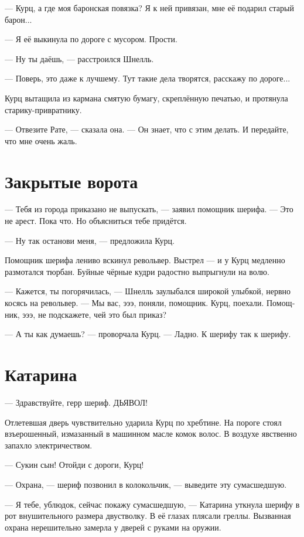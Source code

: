 \documentclass[a4paper,12pt,fleqn]{book}\usepackage{polyglossia}\setdefaultlanguage[babelshorthands=true]{russian}\setotherlanguage{english}\defaultfontfeatures{Ligatures=TeX,Mapping=tex-text}\usepackage{xcolor}\newcommand{\ml}[3]{#2}
\begin{document}
--- Курц, а где моя баронская повязка?
Я к ней привязан, мне её подарил старый барон...

--- Я её выкинула по дороге с мусором.
Прости.

--- Ну ты даёшь, --- расстроился Шнелль.

--- Поверь, это даже к лучшему.
Тут такие дела творятся, расскажу по дороге...

Курц вытащила из кармана смятую бумагу, скреплённую печатью, и протянула старику-привратнику.

--- Отвезите Рате, --- сказала она.
--- Он знает, что с этим делать.
И передайте, что мне очень жаль.

\section{Закрытые ворота}

--- Тебя из города приказано не выпускать, --- заявил помощник шерифа.
--- Это не арест.
Пока что.
Но объясниться тебе придётся.

--- Ну так останови меня, --- предложила Курц.

Помощник шерифа лениво вскинул револьвер.
Выстрел --- и у Курц медленно размотался тюрбан.
Буйные чёрные кудри радостно выпрыгнули на волю.

--- Кажется, ты погорячилась, --- Шнелль заулыбался широкой улыбкой, нервно косясь на револьвер.
--- Мы вас, эээ, поняли, помощник.
Курц, поехали.
Помощник, эээ, не подскажете, чей это был приказ?

--- А ты как думаешь? --- проворчала Курц.
--- Ладно.
К шерифу так к шерифу.

\section{Катарина}

--- Здравствуйте, герр шериф.
ДЬЯВОЛ!

Отлетевшая дверь чувствительно ударила Курц по хребтине.
На пороге стоял взъерошенный, измазанный в машинном масле комок волос.
В воздухе явственно запахло электричеством.

--- Сукин сын!
Отойди с дороги, Курц!

--- Охрана, --- шериф позвонил в колокольчик, --- выведите эту сумасшедшую.

--- Я тебе, ублюдок, сейчас покажу сумасшедшую, --- Катарина уткнула шерифу в рот внушительного размера двустволку.
В её глазах плясали греллы.
Вызванная охрана нерешительно замерла у дверей с руками на оружии.
\end{document}
